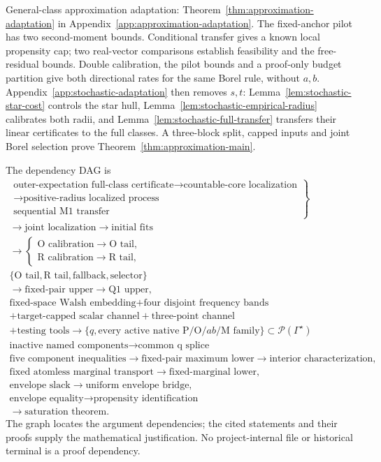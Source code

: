General-class approximation adaptation:
Theorem~\ref{thm:approximation-adaptation} in
Appendix~\ref{app:approximation-adaptation}. The fixed-anchor pilot
has two second-moment bounds. Conditional transfer gives a known local
propensity cap; two real-vector comparisons establish feasibility and
the free-residual bounds. Double calibration, the pilot bounds and a
proof-only budget partition give both directional rates for the same
Borel rule, without $a,b$.
Appendix~\ref{app:stochastic-adaptation} then removes $s,t$:
Lemma~\ref{lem:stochastic-star-cost} controls the star hull,
Lemma~\ref{lem:stochastic-empirical-radius} calibrates both radii,
and Lemma~\ref{lem:stochastic-full-transfer} transfers their linear
certificates to the full classes. A three-block split, capped inputs
and joint Borel selection prove Theorem~\ref{thm:approximation-main}.

The dependency DAG is
\[
\begin{gathered}
\left.
\begin{gathered}
\text{outer-expectation full-class certificate}
\longrightarrow\text{countable-core localization}\\
\longrightarrow\text{positive-radius localized process}\\
\text{sequential M1 transfer}
\end{gathered}
\right\}\\
\longrightarrow\text{joint localization}\longrightarrow\text{initial fits}\\
\longrightarrow
\begin{cases}\text{O calibration}\longrightarrow\text{O tail},\\
\text{R calibration}\longrightarrow\text{R tail},\end{cases}\\
\{\text{O tail},\text{R tail},\text{fallback},\text{selector}\}\\
\longrightarrow\text{fixed-pair upper}\longrightarrow\text{Q1 upper},\\
\text{fixed-space Walsh embedding}+\text{four disjoint frequency bands}\\
+\text{target-capped scalar channel}+\text{three-point channel}\\
+\text{testing tools}\longrightarrow
\{q,\text{every active native P/O/}ab\text{/M family}\}
\subset\mathcal P(\Gamma^\star)\\
\text{inactive named components}\longrightarrow\text{common q splice}\\
\text{five component inequalities}\longrightarrow\text{fixed-pair maximum lower}
\longrightarrow\text{interior characterization},\\
\text{fixed atomless marginal transport}\longrightarrow\text{fixed-marginal lower},\\
\text{envelope slack}\longrightarrow\text{uniform envelope bridge},\\
\text{envelope equality}\longrightarrow\text{propensity identification}\\
\longrightarrow\text{saturation theorem}.
\end{gathered}
\]
The graph locates the argument dependencies; the cited statements and their
proofs supply the mathematical justification.
No project-internal file or historical terminal is a proof dependency.
